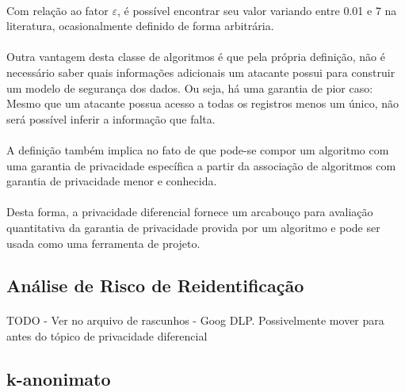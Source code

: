 \paragraph{} Com relação ao fator $\varepsilon$, é possível encontrar seu valor variando entre 0.01 e 7 na literatura, ocasionalmente definido de forma arbitrária\cite{hsu2014differential}.

\paragraph{} Outra vantagem desta classe de algoritmos é que pela própria definição, não é necessário saber quais informações adicionais um atacante possui para construir um modelo de segurança dos dados. Ou seja, há uma garantia de pior caso: Mesmo que um atacante possua acesso a todas os registros menos um único, não será possível inferir a informação que falta.

\paragraph{} A definição também implica no fato de que pode-se compor um algoritmo com uma garantia de privacidade específica a partir da associação de algoritmos com garantia de privacidade menor e conhecida\cite{cummings2018differential}.

\paragraph{} Desta forma, a privacidade diferencial fornece um arcabouço para avaliação quantitativa da garantia de privacidade provida por um algoritmo e pode ser usada como uma ferramenta de projeto\cite{mcsherry2007mechanism}.



\subsection{Análise de Risco de Reidentificação}

\paragraph{} TODO - Ver no arquivo de rascunhos - Goog DLP. Possivelmente mover para antes do tópico de privacidade diferencial

\subsection{k-anonimato}


